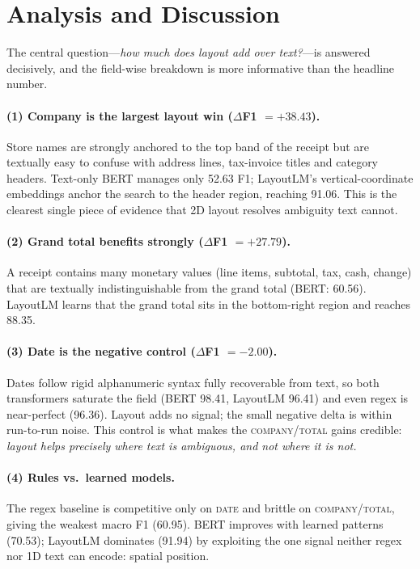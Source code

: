 \documentclass[11pt]{article}
\begin{document}
\section{Analysis and Discussion}
The central question---\emph{how much does layout add over text?}---is answered
decisively, and the field-wise breakdown is more informative than the headline
number.

\paragraph{(1) Company is the largest layout win ($\Delta$F1 $=+38.43$).}
Store names are strongly anchored to the top band of the receipt but are
textually easy to confuse with address lines, tax-invoice titles and category
headers. Text-only BERT manages only 52.63 F1; LayoutLM's vertical-coordinate
embeddings anchor the search to the header region, reaching 91.06. This is the
clearest single piece of evidence that 2D layout resolves ambiguity text cannot.

\paragraph{(2) Grand total benefits strongly ($\Delta$F1 $=+27.79$).}
A receipt contains many monetary values (line items, subtotal, tax, cash, change)
that are textually indistinguishable from the grand total (BERT: 60.56). LayoutLM
learns that the grand total sits in the bottom-right region and reaches 88.35.

\paragraph{(3) Date is the negative control ($\Delta$F1 $=-2.00$).}
Dates follow rigid alphanumeric syntax fully recoverable from text, so both
transformers saturate the field (BERT 98.41, LayoutLM 96.41) and even regex is
near-perfect (96.36). Layout adds no signal; the small negative delta is within
run-to-run noise. This control is what makes the \textsc{company}/\textsc{total}
gains credible: \emph{layout helps precisely where text is ambiguous, and not
where it is not.}

\paragraph{(4) Rules vs.\ learned models.}
The regex baseline is competitive only on \textsc{date} and brittle on
\textsc{company}/\textsc{total}, giving the weakest macro F1 (60.95). BERT improves
with learned patterns (70.53); LayoutLM dominates (91.94) by exploiting the one
signal neither regex nor 1D text can encode: spatial position.
\end{document}
